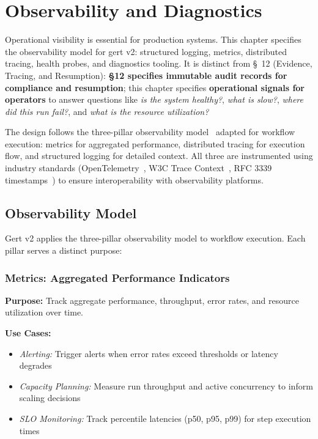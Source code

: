 \chapter{Observability and Diagnostics}

Operational visibility is essential for production systems. This chapter specifies the observability model for gert v2: structured logging, metrics, distributed tracing, health probes, and diagnostics tooling. It is distinct from \S~12 (Evidence, Tracing, and Resumption): \textbf{§12 specifies immutable audit records for compliance and resumption}; this chapter specifies \textbf{operational signals for operators} to answer questions like \textit{is the system healthy?}, \textit{what is slow?}, \textit{where did this run fail?}, and \textit{what is the resource utilization?}

The design follows the three-pillar observability model~\cite{google-sre-book} adapted for workflow execution: metrics for aggregated performance, distributed tracing for execution flow, and structured logging for detailed context. All three are instrumented using industry standards (OpenTelemetry~\cite{otel-spec}, W3C Trace Context~\cite{w3c-trace-context}, RFC 3339 timestamps~\cite{rfc3339}) to ensure interoperability with observability platforms.

\section{Observability Model}

Gert v2 applies the three-pillar observability model to workflow execution. Each pillar serves a distinct purpose:

\subsection{Metrics: Aggregated Performance Indicators}

\textbf{Purpose:} Track aggregate performance, throughput, error rates, and resource utilization over time.

\textbf{Use Cases:}
\begin{itemize}
  \item \textit{Alerting:} Trigger alerts when error rates exceed thresholds or latency degrades
  \item \textit{Capacity Planning:} Measure run throughput and active concurrency to inform scaling decisions
  \item \textit{SLO Monitoring:} Track percentile latencies (p50, p95, p99) for step execution times
\end{itemize}

